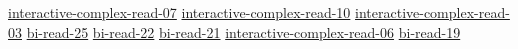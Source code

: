 \hyperref[sec:interactive-complex-read-07]{interactive-complex-read-07}
\hyperref[sec:interactive-complex-read-10]{interactive-complex-read-10}
\hyperref[sec:interactive-complex-read-03]{interactive-complex-read-03}
\hyperref[sec:bi-read-25]{bi-read-25}
\hyperref[sec:bi-read-22]{bi-read-22}
\hyperref[sec:bi-read-21]{bi-read-21}
\hyperref[sec:interactive-complex-read-06]{interactive-complex-read-06}
\hyperref[sec:bi-read-19]{bi-read-19}
